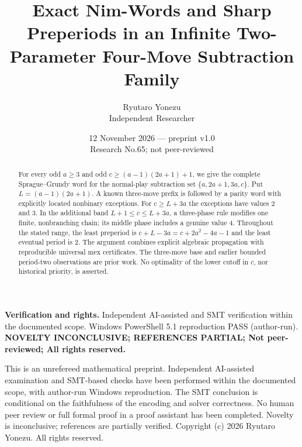 \documentclass[10pt,a4paper]{article}
\title{Exact Nim-Words and Sharp Preperiods in an Infinite Two-Parameter Four-Move Subtraction Family}
\author{Ryutaro Yonezu\\\small Independent Researcher}
\date{12 November 2026 --- preprint v1.0\\\small Research No.65; not peer-reviewed}
\begin{document}
\maketitle
\begin{abstract}
For every odd $a\ge3$ and odd $c\ge(a-1)(2a+1)+1$, we give the complete Sprague--Grundy word for the normal-play subtraction set $\{a,2a+1,3a,c\}$. Put $L=(a-1)(2a+1)$. A known three-move prefix is followed by a parity word with explicitly located nonbinary exceptions. For $c\ge L+3a$ the exceptions have values 2 and 3. In the additional band $L+1\le c\le L+3a$, a three-phase rule modifies one finite, nonbranching chain; its middle phase includes a genuine value 4. Throughout the stated range, the least preperiod is $c+L-3a=c+2a^2-4a-1$ and the least eventual period is 2. The argument combines explicit algebraic propagation with reproducible universal mex certificates. The three-move base and earlier bounded period-two observations are prior work. No optimality of the lower cutoff in $c$, nor historical priority, is asserted.
\end{abstract}
\noindent\textbf{Verification and rights.} Independent AI-assisted and SMT verification within the documented scope. Windows PowerShell 5.1 reproduction PASS (author-run). \textbf{NOVELTY INCONCLUSIVE; REFERENCES PARTIAL; Not peer-reviewed; All rights reserved.}

\smallskip
\noindent This is an unrefereed mathematical preprint. Independent AI-assisted examination and SMT-based checks have been performed within the documented scope, with author-run Windows reproduction. The SMT conclusion is conditional on the faithfulness of the encoding and solver correctness. No human peer review or full formal proof in a proof assistant has been completed. Novelty is inconclusive; references are partially verified. Copyright (c) 2026 Ryutaro Yonezu. All rights reserved.
\end{document}

